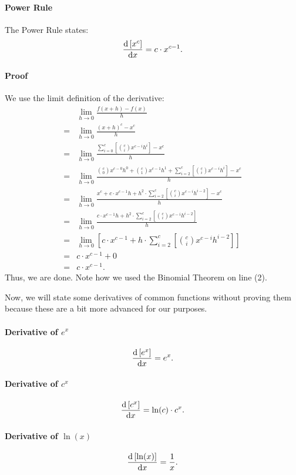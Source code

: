 \documentclass{article}
\begin{document}
\paragraph{Power Rule} The Power Rule states: 
\[\diff{\left[x^c\right]}{x}=c\cdot x^{c-1}.\]

\paragraph{Proof} We use the limit definition of the derivative:
\begin{align*}
    &\lim_{h\to 0}\frac{f(x+h)-f(x)}{h}\\
    =&\lim_{h\to 0}\frac{(x+h)^c-x^c}{h}\\
    =&\lim_{h\to 0}\frac{\sum_{i=0}^{c}\left[\binom{c}{i}x^{c-i}h^i\right]-x^c}{h}\tag{2}\\
    =&\lim_{h\to 0}\frac{\binom{c}{0}x^{c-0}h^0+\binom{c}{1}x^{c-1}h^1+\sum_{i=2}^{c}\left[\binom{c}{i}x^{c-i}h^i\right]-x^c}{h}\\
    =&\lim_{h\to 0}\frac{x^c+c\cdot x^{c-1}h+h^2\cdot \sum_{i=2}^{c}\left[\binom{c}{i}x^{c-i}h^{i-2}\right]-x^c}{h}\\
    =&\lim_{h\to 0}\frac{c\cdot x^{c-1}h+h^2\cdot \sum_{i=2}^{c}\left[\binom{c}{i}x^{c-i}h^{i-2}\right]}{h}\\
    =&\lim_{h\to 0}\left[c\cdot x^{c-1}+h\cdot \sum_{i=2}^{c}\left[\binom{c}{i}x^{c-i}h^{i-2}\right]\right]\\
    =&c\cdot x^{c-1}+0\\
    =&c\cdot x^{c-1}.
\end{align*}
Thus, we are done. Note how we used the Binomial Theorem on line (2). $\boxed{}$

Now, we will state some derivatives of common functions without proving them because these are a bit more advanced for our purposes.

\paragraph{Derivative of $e^x$}
\[\diff{\left[e^x\right]}{x}=e^x.\]

\paragraph{Derivative of $c^x$}
\[\diff{\left[c^x\right]}{x}=\ln(c)\cdot c^x.\]

\paragraph{Derivative of $\ln(x)$}
\[\diff{\left[\ln(x)\right]}{x}=\frac{1}{x}.\]
\end{document}
